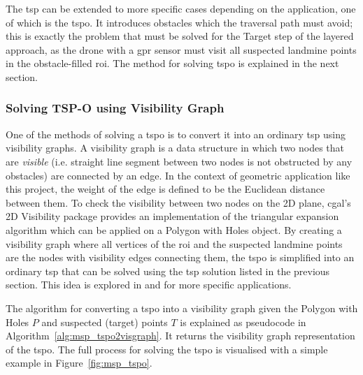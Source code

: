 The \gls{tsp} can be extended to more specific cases depending on the application, one of which is the \gls{tspo}. It introduces obstacles which the traversal path must avoid; this is exactly the problem that must be solved for the Target step of the layered approach, as the drone with a \gls{gpr} sensor must visit all suspected landmine points in the obstacle-filled \gls{roi}. The method for solving \gls{tspo} is explained in the next section. 

\subsubsection{Solving TSP-O using Visibility Graph}

One of the methods of solving a \gls{tspo} is to convert it into an ordinary \gls{tsp} using visibility graphs. A visibility graph is a data structure in which two nodes that are \textit{visible} (i.e. straight line segment between two nodes is not obstructed by any obstacles) are connected by an edge. In the context of geometric application like this project, the weight of the edge is defined to be the Euclidean distance between them. To check the visibility between two nodes on the 2D plane, \gls{cgal}'s 2D Visibility package \cite{cgal2024visibility} provides an implementation of the triangular expansion algorithm which can be applied on a Polygon with Holes object. By creating a visibility graph where all vertices of the \gls{roi} and the suspected landmine points are the nodes with visibility edges connecting them, the \gls{tspo} is simplified into an ordinary \gls{tsp} that can be solved using the \gls{tsp} solution listed in the previous section. This idea is explored in \cite{barb2024tspo} and \cite{bhat2024tspo} for more specific applications. 

The algorithm for converting a \gls{tspo} into a visibility graph given the Polygon with Holes $P$ and suspected (target) points $T$ is explained as pseudocode in Algorithm~\ref{alg:msp_tspo2visgraph}. It returns the visibility graph representation of the \gls{tspo}. The full process for solving the \gls{tspo} is visualised with a simple example in Figure~\ref{fig:msp_tspo}.


